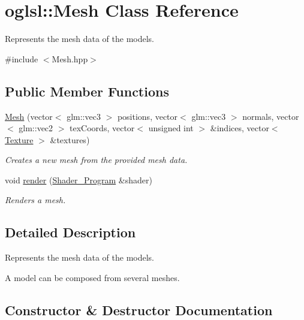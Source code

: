 \hypertarget{classoglsl_1_1_mesh}{}\section{oglsl\+:\+:Mesh Class Reference}
\label{classoglsl_1_1_mesh}


Represents the mesh data of the models.  




{\ttfamily \#include $<$Mesh.\+hpp$>$}

\subsection*{Public Member Functions}
\begin{DoxyCompactItemize}
\item 
\mbox{\hyperlink{classoglsl_1_1_mesh_ac8a19dfa3be1aa4a8c9396057f7b5c78}{Mesh}} (vector$<$ glm\+::vec3 $>$ positions, vector$<$ glm\+::vec3 $>$ normals, vector$<$ glm\+::vec2 $>$ tex\+Coords, vector$<$ unsigned int $>$ \&indices, vector$<$ \mbox{\hyperlink{namespaceoglsl_a3f3bf2d9553fda1a155d7492ee30d7d0}{Texture}} $>$ \&textures)
\begin{DoxyCompactList}\small\item\em Creates a new mesh from the provided mesh data. \end{DoxyCompactList}\item 
void \mbox{\hyperlink{classoglsl_1_1_mesh_a358dea364d978e49c8df22fa9ad62c21}{render}} (\mbox{\hyperlink{classoglsl_1_1_shader___program}{Shader\+\_\+\+Program}} \&shader)
\begin{DoxyCompactList}\small\item\em Renders a mesh. \end{DoxyCompactList}\end{DoxyCompactItemize}


\subsection{Detailed Description}
Represents the mesh data of the models. 

A model can be composed from several meshes. 

\subsection{Constructor \& Destructor Documentation}
\mbox{\label{classoglsl_1_1_mesh_ac8a19dfa3be1aa4a8c9396057f7b5c78}} 
